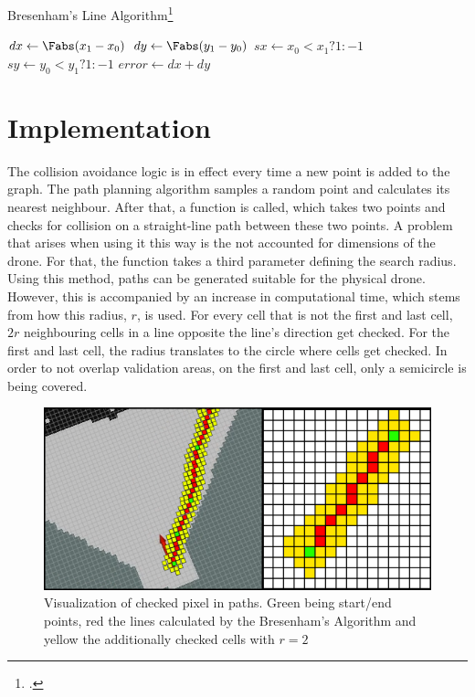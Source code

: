 \begin{algorithm}[]
	\caption{Bresenham's Line Algorithm\footcite{Zingl2012}}
	$dx \gets \Fabs(x_1-x_0)$\;
	$dy \gets \Fabs(y_1-y_0)$\;
	$sx \gets x_0<x_1 ? 1 : -1$\;
	$sy \gets y_0<y_1 ? 1 : -1$\;
	$error \gets dx + dy$\;
\end{algorithm}



\section{Implementation}
The collision avoidance logic is in effect every time a new point is added to the graph. The path planning algorithm samples a random point and calculates its nearest neighbour. After that, a function is called, which takes two points and checks for collision on a straight-line path between these two points.\newline
A problem that arises when using it this way is the not accounted for dimensions of the drone. For that, the function takes a third parameter defining the search radius. Using this method, paths can be generated suitable for the physical drone. However, this is accompanied by an increase in computational time, which stems from how this radius, $r$, is used. For every cell that is not the first and last cell, $2r$ neighbouring cells in a line opposite the line's direction get checked. For the first and last cell, the radius translates to the circle where cells get checked. In order to not overlap validation areas, on the first and last cell, only a semicircle is being covered. 

\begin{figure}[h]
	\centering
	\includegraphics[width=0.8\linewidth]{img/CheckedPixels}
	\caption{Visualization of checked pixel in paths. Green being start/end points, red the lines calculated by the Bresenham's Algorithm and yellow the additionally checked cells with $r = 2$}
	\label{fig:collision_detection_checkedPixels}
\end{figure}

